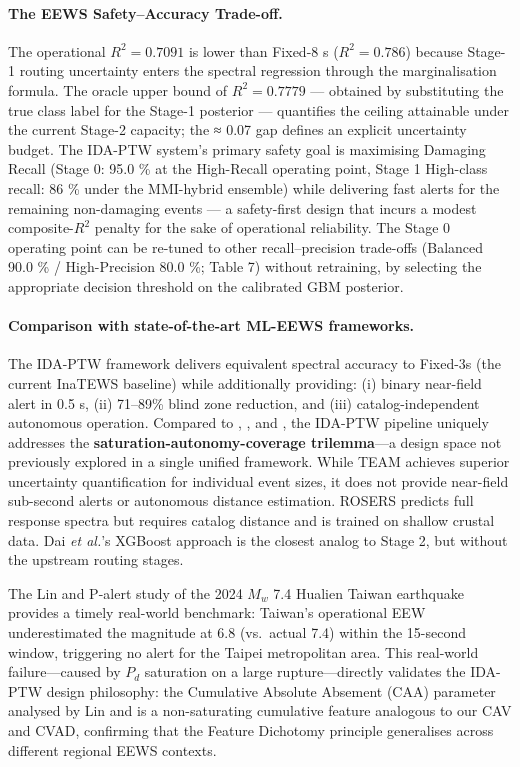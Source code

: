 \documentclass[10pt]{article}
\renewcommand{\cite}[1]{\citep{#1}}
\newcommand{\etal}{\textit{et al.}}
\begin{document}
\paragraph{The EEWS Safety--Accuracy Trade-off.} The operational \(R^2 = 0.7091\) is lower than Fixed-8 s (\(R^2 = 0.786\)) because Stage-1 routing uncertainty enters the spectral regression through the marginalisation formula. The oracle upper bound of \(R^2 = 0.7779\) --- obtained by substituting the true class label for the Stage-1 posterior --- quantifies the ceiling attainable under the current Stage-2 capacity; the ≈ 0.07 gap defines an explicit uncertainty budget. The IDA-PTW system's primary safety goal is maximising Damaging Recall (Stage 0: 95.0 \% at the High-Recall operating point, Stage 1 High-class recall: 86 \% under the MMI-hybrid ensemble) while delivering fast alerts for the remaining non-damaging events --- a safety-first design that incurs a modest composite-\(R^2\) penalty for the sake of operational reliability. The Stage 0 operating point can be re-tuned to other recall--precision trade-offs (Balanced 90.0 \% / High-Precision 80.0 \%; Table 7) without retraining, by selecting the appropriate decision threshold on the calibrated GBM posterior.

\paragraph{Comparison with state-of-the-art ML-EEWS frameworks.} The IDA-PTW framework delivers equivalent spectral accuracy to Fixed-3s (the current InaTEWS baseline) while additionally providing: (i) binary near-field alert in 0.5 s, (ii) 71--89\% blind zone reduction, and (iii) catalog-independent autonomous operation. Compared to \citet{ref77}, \citet{ref32}, and \citet{ref35}, the IDA-PTW pipeline uniquely addresses the \textbf{saturation-autonomy-coverage trilemma}---a design space not previously explored in a single unified framework. While TEAM achieves superior uncertainty quantification for individual event sizes, it does not provide near-field sub-second alerts or autonomous distance estimation. ROSERS predicts full response spectra but requires catalog distance and is trained on shallow crustal data. Dai \etal{}'s \cite{ref35} XGBoost approach is the closest analog to Stage 2, but without the upstream routing stages.

The Lin and \citet{ref85} P-alert study of the 2024 \(M_w\) 7.4 Hualien Taiwan earthquake provides a timely real-world benchmark: Taiwan's operational EEW underestimated the magnitude at 6.8 (vs.~actual 7.4) within the 15-second window, triggering no alert for the Taipei metropolitan area. This real-world failure---caused by \(P_d\) saturation on a large rupture---directly validates the IDA-PTW design philosophy: the Cumulative Absolute Absement (CAA) parameter analysed by Lin and \citet{ref85} is a non-saturating cumulative feature analogous to our CAV and CVAD, confirming that the Feature Dichotomy principle generalises across different regional EEWS contexts.
\end{document}
